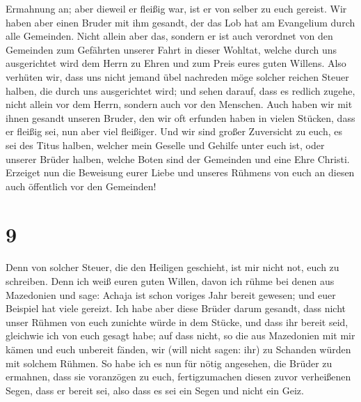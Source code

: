 Ermahnung an; aber dieweil er fleißig war, ist er von selber zu euch
gereist.  Wir haben aber einen Bruder mit ihm gesandt,
der das Lob hat am Evangelium durch alle Gemeinden. 
Nicht allein aber das, sondern er ist auch verordnet von den Gemeinden
zum Gefährten unserer Fahrt in dieser Wohltat, welche durch uns
ausgerichtet wird dem Herrn zu Ehren und zum Preis eures guten Willens.
 Also verhüten wir, dass uns nicht jemand übel nachreden
möge solcher reichen Steuer halben, die durch uns ausgerichtet wird;
 und sehen darauf, dass es redlich zugehe, nicht allein
vor dem Herrn, sondern auch vor den Menschen.  Auch haben
wir mit ihnen gesandt unseren Bruder, den wir oft erfunden haben in
vielen Stücken, dass er fleißig sei, nun aber viel fleißiger.
 Und wir sind großer Zuversicht zu euch, es sei des Titus
halben, welcher mein Geselle und Gehilfe unter euch ist, oder unserer
Brüder halben, welche Boten sind der Gemeinden und eine Ehre Christi.
 Erzeiget nun die Beweisung eurer Liebe und unseres
Rühmens von euch an diesen auch öffentlich vor den Gemeinden!

\hypertarget{section-8}{%
\section{9}\label{section-8}}

 Denn von solcher Steuer, die den Heiligen geschieht, ist
mir nicht not, euch zu schreiben.  Denn ich weiß euren
guten Willen, davon ich rühme bei denen aus Mazedonien und sage: Achaja
ist schon voriges Jahr bereit gewesen; und euer Beispiel hat viele
gereizt.  Ich habe aber diese Brüder darum gesandt, dass
nicht unser Rühmen von euch zunichte würde in dem Stücke, und dass ihr
bereit seid, gleichwie ich von euch gesagt habe;  auf dass
nicht, so die aus Mazedonien mit mir kämen und euch unbereit fänden, wir
(will nicht sagen: ihr) zu Schanden würden mit solchem Rühmen.
 So habe ich es nun für nötig angesehen, die Brüder zu
ermahnen, dass sie voranzögen zu euch, fertigzumachen diesen zuvor
verheißenen Segen, dass er bereit sei, also dass es sei ein Segen und
nicht ein Geiz.

